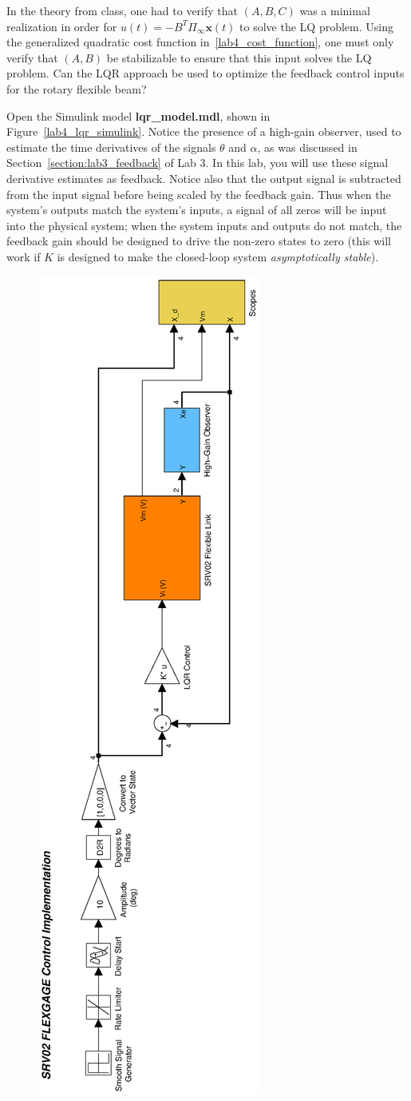 \begin{enumerate}
\begin{enumerate}
                    In the theory from class, one had to verify that $(A,B,C)$ was a minimal realization in order for $u(t)=-B^T \Pi_{\infty} \mathbf{x}(t)$ to solve the LQ problem. Using the generalized quadratic cost function in~\eqref{lab4_cost_function}, one must only verify that $(A,B)$ be stabilizable to ensure that this input solves the LQ problem. Can the LQR approach be used to optimize the feedback control inputs for the rotary flexible beam?

                    Open the Simulink model \textbf{lqr\_model.mdl}, shown in Figure~\ref{lab4_lqr_simulink}. Notice the presence of a high-gain observer, used to estimate the time derivatives of the signals $\theta$ and $\alpha$, as was discussed in Section~\ref{section:lab3_feedback} of Lab 3. In this lab, you will use these signal derivative estimates as feedback. Notice also that the output signal is subtracted from the input signal before being scaled by the feedback gain. Thus when the system's outputs match the system's inputs, a signal of all zeros will be input into the physical system; when the system inputs and outputs do not match, the feedback gain should be designed to drive the non-zero states to zero (this will work if $K$ is designed to make the closed-loop system \emph{asymptotically stable}).
                    \begin{figure}[htb!]
                        \includegraphics[width=0.3\linewidth,angle=-90]{eps/lab_4/lqr_simulink}

\end{figure}
\end{enumerate}
\end{enumerate}

